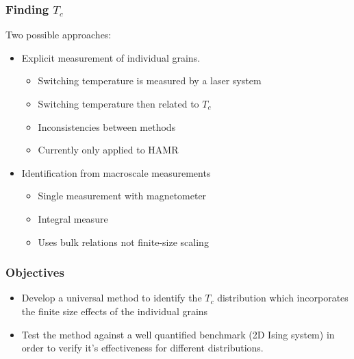 \documentclass{beamer}
\begin{document}
\begin{frame}
	\frametitle{Finding $T_c$}
	Two possible approaches:
	\vspace{4mm}
	\begin{itemize}
		\item{Explicit measurement of individual grains.\footnotemark[3]}
		\begin{itemize}
			\item{Switching temperature is measured by a laser system}
			\item{Switching temperature then related to $T_c$}
			\item{Inconsistencies between methods}
			\item{Currently only applied to HAMR}
		\end{itemize}
		\vspace{4mm}
		\item{Identification from macroscale measurements\footnotemark[4]}
		\begin{itemize}
			\item{Single measurement with magnetometer}
			\item{Integral measure}
			\item{Uses bulk relations not finite-size scaling}
		\end{itemize}
	\end{itemize}
\end{frame}

\begin{frame}
	\frametitle{Objectives}
	\begin{itemize}
		\item{Develop a universal method to identify the $T_c$ distribution which incorporates the finite size effects of the individual grains\newline}
		\item{Test the method against a well quantified benchmark (2D Ising system) in order to verify it's effectiveness for different distributions.\newline}
	\end{itemize}
\end{frame}
\end{document}
